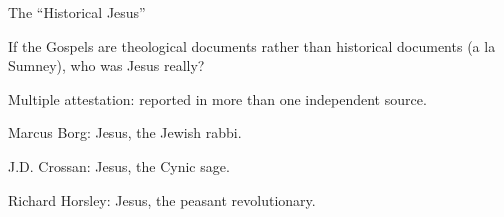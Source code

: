 \documentclass{article}
\begin{document}
    \centerline{The ``Historical Jesus''}

    If the Gospels are theological documents rather than historical documents (a la Sumney), who was Jesus really?

    Multiple attestation: reported in more than one independent source.

    Marcus Borg: Jesus, the Jewish rabbi.

    J.D. Crossan: Jesus, the Cynic sage.

    Richard Horsley: Jesus, the peasant revolutionary.
\end{document}
